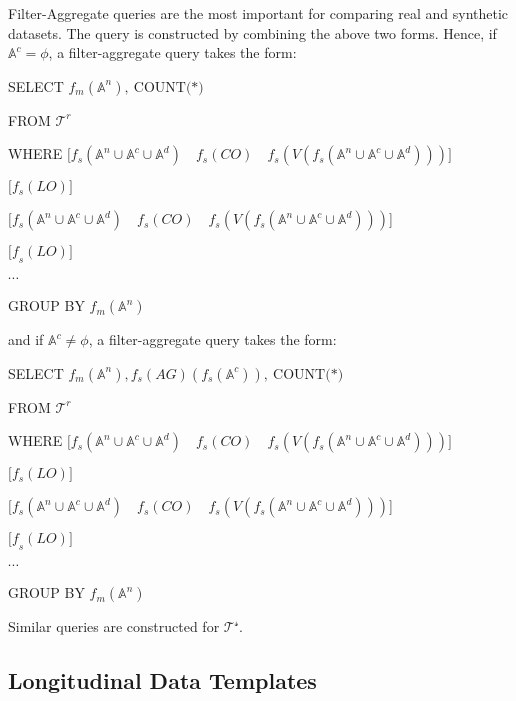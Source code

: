 Filter-Aggregate queries are the most important for comparing real and
synthetic datasets. The query is constructed by combining the above two
forms. Hence, if \(\mathbb{A}^{c} = \phi\), a filter-aggregate query
takes the form:

SELECT \(f_{m}(\mathbb{A}^{n})\mathrm{,\ }\mathrm{COUNT(}\mathrm{*)}\)

FROM \(\mathcal{T}^{r}\)

WHERE
\(\lbrack f_{s}(\mathbb{A}^{n} \cup \mathbb{A}^{c} \cup \mathbb{A}^{d})\quad f_{s}(CO)\quad f_{s}(V(f_{s}(\mathbb{A}^{n} \cup \mathbb{A}^{c} \cup \mathbb{A}^{d})))\rbrack\)

\(\lbrack f_{s}(LO)\rbrack\)

\(\lbrack f_{s}(\mathbb{A}^{n} \cup \mathbb{A}^{c} \cup \mathbb{A}^{d})\quad f_{s}(CO)\quad f_{s}(V(f_{s}(\mathbb{A}^{n} \cup \mathbb{A}^{c} \cup \mathbb{A}^{d})))\){]}

\({\lbrack f}_{s}(LO)\rbrack\)

\(\cdots\)

GROUP BY \(f_{m}(\mathbb{A}^{n})\)

and if \(\mathbb{A}^{c} \neq \phi\), a filter-aggregate query takes the
form:

SELECT
\(f_{m}(\mathbb{A}^{n}),f_{s}(AG)(f_{s}(\mathbb{A}^{c}))\mathrm{,\ }\mathrm{COUNT(}\mathrm{*)}\)

FROM \(\mathcal{T}^{r}\)

WHERE
\(\lbrack f_{s}(\mathbb{A}^{n} \cup \mathbb{A}^{c} \cup \mathbb{A}^{d})\quad f_{s}(CO)\quad f_{s}(V(f_{s}(\mathbb{A}^{n} \cup \mathbb{A}^{c} \cup \mathbb{A}^{d})))\rbrack\)

\(\lbrack f_{s}(LO)\rbrack\)

\(\lbrack f_{s}(\mathbb{A}^{n} \cup \mathbb{A}^{c} \cup \mathbb{A}^{d})\quad f_{s}(CO)\quad f_{s}(V(f_{s}(\mathbb{A}^{n} \cup \mathbb{A}^{c} \cup \mathbb{A}^{d})))\){]}

\({\lbrack f}_{s}(LO)\rbrack\)

\(\cdots\)

GROUP BY \(f_{m}(\mathbb{A}^{n})\)

Similar queries are constructed for \(\mathcal{T}^{\mathcal{s}}\).

\hypertarget{longitudinal-data-templates}{%
\subsection{Longitudinal Data
Templates}\label{longitudinal-data-templates}}

